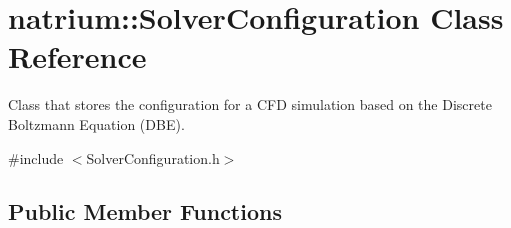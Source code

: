 \hypertarget{classnatrium_1_1SolverConfiguration}{\section{natrium\-:\-:Solver\-Configuration Class Reference}
\label{classnatrium_1_1SolverConfiguration}
}


Class that stores the configuration for a C\-F\-D simulation based on the Discrete Boltzmann Equation (D\-B\-E).  




{\ttfamily \#include $<$Solver\-Configuration.\-h$>$}

\subsection*{Public Member Functions}
